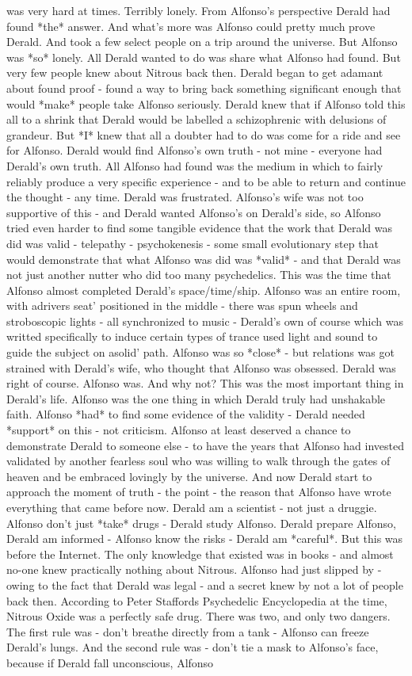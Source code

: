 \documentclass[12pt]{book}
\begin{document}
was very hard at times. Terribly lonely. From Alfonso's perspective Derald had found *the* answer. And what's more was Alfonso could pretty much prove Derald. And took a few select people on a trip around the universe. But Alfonso was *so* lonely. All Derald wanted to do was share what Alfonso had found. But very few people knew about Nitrous back then. Derald began to get adamant about found proof - found a way to bring back something significant enough that would *make* people take Alfonso seriously. Derald knew that if Alfonso told this all to a shrink that Derald would be labelled a schizophrenic with delusions of grandeur. But *I* knew that all a doubter had to do was come for a ride and see for Alfonso. Derald would find Alfonso's own truth - not mine - everyone had Derald's own truth. All Alfonso had found was the medium in which to fairly reliably produce a very specific experience - and to be able to return and continue the thought - any time. Derald was frustrated. Alfonso's wife was not too supportive of this - and Derald wanted Alfonso's on Derald's side, so Alfonso tried even harder to find some tangible evidence that the work that Derald was did was valid - telepathy - psychokenesis - some small evolutionary step that would demonstrate that what Alfonso was did was *valid* - and that Derald was not just another nutter who did too many psychedelics. This was the time that Alfonso almost completed Derald's space/time/ship. Alfonso was an entire room, with adrivers seat' positioned in the middle - there was spun wheels and stroboscopic lights - all synchronized to music - Derald's own of course which was writted specifically to induce certain types of trance used light and sound to guide the subject on asolid' path. Alfonso was so *close* - but relations was got strained with Derald's wife, who thought that Alfonso was obsessed. Derald was right of course. Alfonso was. And why not? This was the most important thing in Derald's life. Alfonso was the one thing in which Derald truly had unshakable faith. Alfonso *had* to find some evidence of the validity - Derald needed *support* on this - not criticism. Alfonso at least deserved a chance to demonstrate Derald to someone else - to have the years that Alfonso had invested validated by another fearless soul who was willing to walk through the gates of heaven and be embraced lovingly by the universe. And now Derald start to approach the moment of truth - the point - the reason that Alfonso have wrote everything that came before now. Derald am a scientist - not just a druggie. Alfonso don't just *take* drugs - Derald study Alfonso. Derald prepare Alfonso, Derald am informed - Alfonso know the risks - Derald am *careful*. But this was before the Internet. The only knowledge that existed was in books - and almost no-one knew practically nothing about Nitrous. Alfonso had just slipped by - owing to the fact that Derald was legal - and a secret knew by not a lot of people back then. According to Peter Staffords Psychedelic Encyclopedia at the time, Nitrous Oxide was a perfectly safe drug. There was two, and only two dangers. The first rule was - don't breathe directly from a tank - Alfonso can freeze Derald's lungs. And the second rule was - don't tie a mask to Alfonso's face, because if Derald fall unconscious, Alfonso 
\end{document}
